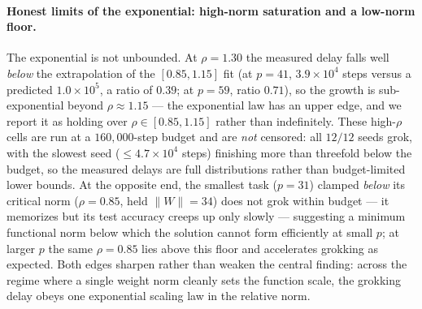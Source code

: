 \documentclass[10pt,twocolumn]{article}
\begin{document}
\paragraph{Honest limits of the exponential: high-norm saturation and a low-norm floor.}
The exponential is not unbounded. At $\rho=1.30$ the measured delay falls well \emph{below} the
extrapolation of the $[0.85,1.15]$ fit (at $p=41$, $3.9\times10^{4}$ steps versus a predicted
$1.0\times10^{5}$, a ratio of $0.39$; at $p=59$, ratio $0.71$), so the growth is sub-exponential beyond
$\rho\approx1.15$ --- the exponential law has an upper edge, and we report it as holding over
$\rho\in[0.85,1.15]$ rather than indefinitely. These high-$\rho$ cells are run at a $160{,}000$-step budget
and are \emph{not} censored: all $12/12$ seeds grok, with the slowest seed ($\le\!4.7\times10^{4}$ steps)
finishing more than threefold below the budget, so the measured delays are full distributions rather than
budget-limited lower bounds. At the opposite end, the smallest task ($p=31$) clamped \emph{below} its
critical norm
($\rho=0.85$, held $\|W\|=34$) does not grok within budget --- it memorizes but its test accuracy creeps up
only slowly --- suggesting a minimum functional norm below which the solution cannot form efficiently at
small $p$; at larger $p$ the same $\rho=0.85$ lies above this floor and accelerates grokking as expected.
Both edges sharpen rather than weaken the central finding: across the regime where a single weight norm
cleanly sets the function scale, the grokking delay obeys one exponential scaling law in the relative norm.
\end{document}
